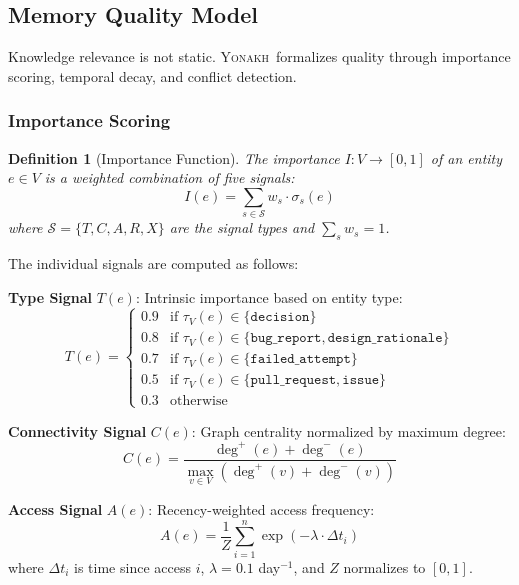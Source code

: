 \documentclass[10pt,journal,compsoc]{IEEEtran}
\newcommand{\yonakh}{\textsc{Yonakh}}
\newtheorem{definition}{Definition}
\begin{document}
\subsection{Memory Quality Model}

Knowledge relevance is not static. \yonakh\ formalizes quality through importance scoring, temporal decay, and conflict detection.

\subsubsection{Importance Scoring}

\begin{definition}[Importance Function]
The importance $I: V \to [0,1]$ of an entity $e \in V$ is a weighted combination of five signals:
\begin{equation}
I(e) = \sum_{s \in \mathcal{S}} w_s \cdot \sigma_s(e)
\end{equation}
where $\mathcal{S} = \{T, C, A, R, X\}$ are the signal types and $\sum_{s} w_s = 1$.
\end{definition}

The individual signals are computed as follows:

\textbf{Type Signal} $T(e)$: Intrinsic importance based on entity type:
\begin{equation}
T(e) = \begin{cases}
0.9 & \text{if } \tau_V(e) \in \{\texttt{decision}\} \\
0.8 & \text{if } \tau_V(e) \in \{\texttt{bug\_report}, \texttt{design\_rationale}\} \\
0.7 & \text{if } \tau_V(e) \in \{\texttt{failed\_attempt}\} \\
0.5 & \text{if } \tau_V(e) \in \{\texttt{pull\_request}, \texttt{issue}\} \\
0.3 & \text{otherwise}
\end{cases}
\end{equation}

\textbf{Connectivity Signal} $C(e)$: Graph centrality normalized by maximum degree:
\begin{equation}
C(e) = \frac{\deg^+(e) + \deg^-(e)}{\max_{v \in V}(\deg^+(v) + \deg^-(v))}
\end{equation}

\textbf{Access Signal} $A(e)$: Recency-weighted access frequency:
\begin{equation}
A(e) = \frac{1}{Z} \sum_{i=1}^{n} \exp\left(-\lambda \cdot \Delta t_i\right)
\end{equation}
where $\Delta t_i$ is time since access $i$, $\lambda = 0.1$ day$^{-1}$, and $Z$ normalizes to $[0,1]$.
\end{document}
